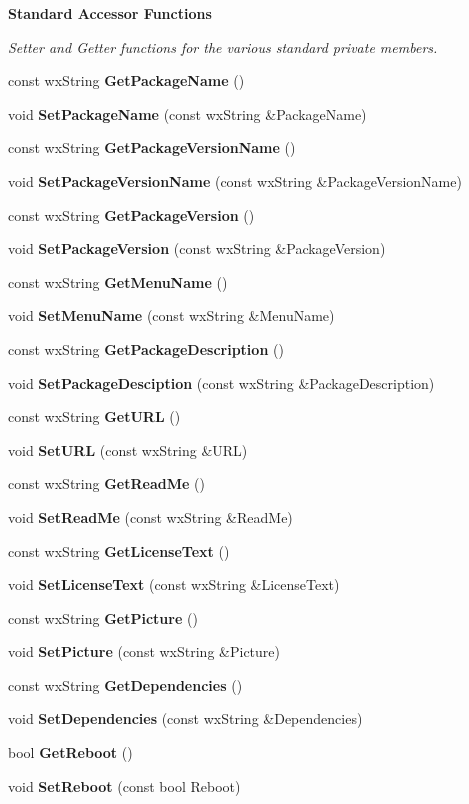 \begin{Indent}{\bf Standard Accessor Functions}\par
{\em Setter and Getter functions for the various standard private members. }\begin{CompactItemize}
\item 
const wx\-String {\bf Get\-Package\-Name} ()
\item 
void {\bf Set\-Package\-Name} (const wx\-String \&Package\-Name)
\item 
const wx\-String {\bf Get\-Package\-Version\-Name} ()
\item 
void {\bf Set\-Package\-Version\-Name} (const wx\-String \&Package\-Version\-Name)
\item 
const wx\-String {\bf Get\-Package\-Version} ()
\item 
void {\bf Set\-Package\-Version} (const wx\-String \&Package\-Version)
\item 
const wx\-String {\bf Get\-Menu\-Name} ()
\item 
void {\bf Set\-Menu\-Name} (const wx\-String \&Menu\-Name)
\item 
const wx\-String {\bf Get\-Package\-Description} ()
\item 
void {\bf Set\-Package\-Desciption} (const wx\-String \&Package\-Description)
\item 
const wx\-String {\bf Get\-URL} ()
\item 
void {\bf Set\-URL} (const wx\-String \&URL)
\item 
const wx\-String {\bf Get\-Read\-Me} ()
\item 
void {\bf Set\-Read\-Me} (const wx\-String \&Read\-Me)
\item 
const wx\-String {\bf Get\-License\-Text} ()
\item 
void {\bf Set\-License\-Text} (const wx\-String \&License\-Text)
\item 
const wx\-String {\bf Get\-Picture} ()
\item 
void {\bf Set\-Picture} (const wx\-String \&Picture)
\item 
const wx\-String {\bf Get\-Dependencies} ()
\item 
void {\bf Set\-Dependencies} (const wx\-String \&Dependencies)
\item 
bool {\bf Get\-Reboot} ()
\item 
void {\bf Set\-Reboot} (const bool Reboot)
\end{CompactItemize}
\end{Indent}
